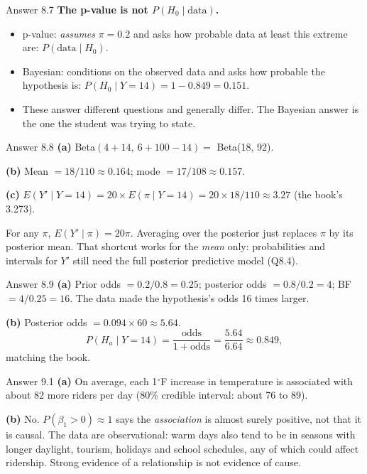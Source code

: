 \documentclass[aspectratio=43,11pt]{beamer}
\begin{document}
\begin{frame}{Answer 8.7}
  \textbf{The p-value is not $P(H_0 \mid \text{data})$.}
  \begin{itemize}
    \item p-value: \emph{assumes} $\pi = 0.2$ and asks how probable data
      at least this extreme are: $P(\text{data} \mid H_0)$.
    \item Bayesian: conditions on the observed data and asks how probable
      the hypothesis is: $P(H_0 \mid Y = 14) = 1 - 0.849 = 0.151$.
    \item These answer different questions and generally differ.
      The Bayesian answer is the one the student was trying to state.
  \end{itemize}
\end{frame}

\begin{frame}{Answer 8.8}
  \textbf{(a)} Beta$(4 + 14,\ 6 + 100 - 14) = $ Beta(18, 92).
  \vspace{0.4em}

  \textbf{(b)} Mean $= 18/110 \approx 0.164$; \quad
  mode $= 17/108 \approx 0.157$.
  \vspace{0.4em}

  \textbf{(c)} $E(Y' \mid Y = 14) = 20 \times E(\pi \mid Y = 14)
  = 20 \times 18/110 \approx 3.27$ (the book's 3.273).
  \vspace{0.3em}

  For any $\pi$, $E(Y' \mid \pi) = 20\pi$. Averaging over the posterior
  just replaces $\pi$ by its posterior mean. That shortcut works for the
  \emph{mean} only: probabilities and intervals for $Y'$ still need the
  full posterior predictive model (Q8.4).
\end{frame}

\begin{frame}{Answer 8.9}
  \textbf{(a)} Prior odds $= 0.2/0.8 = 0.25$; posterior odds
  $= 0.8/0.2 = 4$; BF $= 4/0.25 = 16$. The data made the hypothesis's
  odds 16 times larger.
  \vspace{0.6em}

  \textbf{(b)} Posterior odds $= 0.094 \times 60 \approx 5.64$.
  \[
    P(H_a \mid Y = 14) = \frac{\text{odds}}{1 + \text{odds}}
    = \frac{5.64}{6.64} \approx 0.849,
  \]
  matching the book.
\end{frame}

\begin{frame}{Answer 9.1}
  \textbf{(a)} On average, each 1$^\circ$F increase in temperature is
  associated with about 82 more riders per day (80\% credible interval:
  about 76 to 89).
  \vspace{0.6em}

  \textbf{(b)} No. $P(\beta_1 > 0) \approx 1$ says the
  \emph{association} is almost surely positive, not that it is causal. The
  data are observational: warm days also tend to be in seasons with
  longer daylight, tourism, holidays and school schedules, any of which
  could affect ridership. Strong evidence of a relationship is not
  evidence of cause.
\end{frame}
\end{document}
